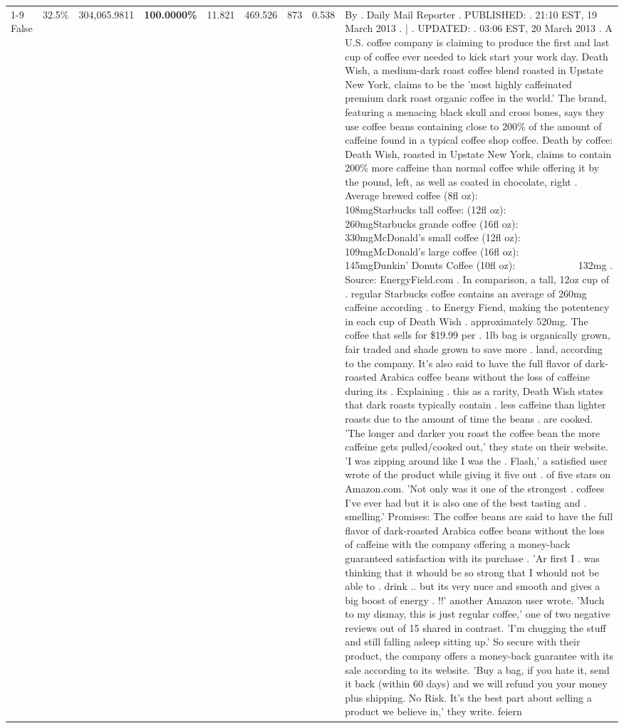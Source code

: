 \begin{table}[H]
{\begin{tabular}{lllrlllll}
\cline{1-9}
False & 32.5\% & 304,065.9811 & \bfseries \color{red} 100.0000\% & 11.821 & 469.526 & 873 & 0.538 & By . Daily Mail Reporter . PUBLISHED: . 21:10 EST, 19 March 2013 . | . UPDATED: . 03:06 EST, 20 March 2013 . A U.S. coffee company is claiming to produce the first and last cup of coffee ever needed to kick start your work day. Death Wish, a medium-dark roast coffee blend roasted in Upstate New York, claims to be the 'most highly caffeinated premium dark roast organic coffee in the world.' The brand, featuring a menacing black skull and cross bones, says they use coffee beans containing close to 200\% of the amount of caffeine found in a typical coffee shop coffee. Death by coffee: Death Wish, roasted in Upstate New York, claims to contain 200\% more caffeine than normal coffee while offering it by the pound, left, as well as coated in chocolate, right . Average brewed coffee (8fl oz):              108mgStarbucks tall coffee: (12fl oz):                260mgStarbucks grande coffee (16fl oz):         330mgMcDonald's small coffee (12fl oz):           109mgMcDonald's large coffee (16fl oz):           145mgDunkin' Donuts Coffee (10fl oz):             132mg . Source: EnergyField.com . In comparison, a tall, 12oz cup of . regular Starbucks coffee contains an average of 260mg caffeine according . to Energy Fiend, making the potentency in each cup of Death Wish . approximately 520mg. The coffee that sells for \$19.99 per . 1lb bag is organically grown, fair traded and shade grown to save more . land, according to the company. It's also said to have the full flavor of dark-roasted Arabica coffee beans without the loss of caffeine during its . Explaining . this as a rarity, Death Wish states that dark roasts typically contain . less caffeine than lighter roasts due to the amount of time the beans . are cooked. 'The longer and darker you roast the coffee bean the more caffeine gets pulled/cooked out,' they state on their website. 'I was zipping around like I was the . Flash,' a satisfied user wrote of the product while giving it five out . of five stars on Amazon.com. 'Not only was it one of the strongest . coffees I've ever had but it is also one of the best tasting and . smelling.’ Promises: The coffee beans are said to have the full flavor of dark-roasted Arabica coffee beans without the loss of caffeine with the company offering a money-back guaranteed satisfaction with its purchase . 'Ar first I . was thinking that it whould be so strong that I whould not be able to . drink .. but its very nuce and smooth and gives a big boost of energy . !!' another Amazon user wrote. 'Much to my dismay, this is just regular coffee,' one of two negative reviews out of 15 shared in contrast. 'I'm chugging the stuff and still falling asleep sitting up.' So secure with their product, the company offers a money-back guarantee with its sale according to its website. 'Buy a bag, if you hate it, send it back (within 60 days) and we will refund you your money plus shipping. No Risk. It’s the best part about selling a product we believe in,' they write. feiern \\

\end{tabular}}
\end{table}
